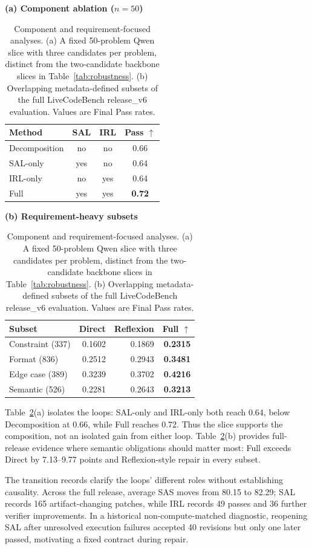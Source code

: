 \documentclass{article}
\newcommand{\up}{\ensuremath{\uparrow}}
\begin{document}
\begin{table}[H]
\centering
\small
\begin{minipage}[t]{0.43\linewidth}\centering
\textbf{(a) Component ablation ($n=50$)}\\[2pt]
\begin{tabular}{@{}lccc@{}}
\toprule
Method & SAL & IRL & Pass \up \\
\midrule
Decomposition & no & no & 0.66 \\
SAL-only & yes & no & 0.64 \\
IRL-only & no & yes & 0.64 \\
Full & yes & yes & \textbf{0.72} \\
\bottomrule
\end{tabular}
\end{minipage}\hfill
\begin{minipage}[t]{0.54\linewidth}\centering
\textbf{(b) Requirement-heavy subsets}\\[2pt]
\begin{tabular}{@{}lrrr@{}}
\toprule
Subset & Direct & Reflexion & Full \up \\
\midrule
Constraint (337) & 0.1602 & 0.1869 & \textbf{0.2315} \\
Format (836) & 0.2512 & 0.2943 & \textbf{0.3481} \\
Edge case (389) & 0.3239 & 0.3702 & \textbf{0.4216} \\
Semantic (526) & 0.2281 & 0.2643 & \textbf{0.3213} \\
\bottomrule
\end{tabular}
\end{minipage}
\caption{Component and requirement-focused analyses. (a) A fixed 50-problem Qwen slice with three candidates per problem, distinct from the two-candidate backbone slices in Table~\ref{tab:robustness}. (b) Overlapping metadata-defined subsets of the full LiveCodeBench release\_v6 evaluation. Values are Final Pass rates.}
\label{tab:rq3}
\end{table}

Table~\ref{tab:rq3}(a) isolates the loops: SAL-only and IRL-only both reach 0.64, below Decomposition at 0.66, while Full reaches 0.72. Thus the slice supports the composition, not an isolated gain from either loop. Table~\ref{tab:rq3}(b) provides full-release evidence where semantic obligations should matter most: Full exceeds Direct by 7.13--9.77 points and Reflexion-style repair in every subset.

The transition records clarify the loops' different roles without establishing causality. Across the full release, average SAS moves from 80.15 to 82.29; SAL records 165 artifact-changing patches, while IRL records 49 passes and 36 further verifier improvements. In a historical non-compute-matched diagnostic, reopening SAL after unresolved execution failures accepted 40 revisions but only one later passed, motivating a fixed contract during repair.
\end{document}
